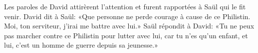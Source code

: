Les paroles de David attirèrent l’attention et furent rapportées à Saül qui le fit venir.
David dit à Saül: «Que personne ne perde courage à cause de ce Philistin.
	Moi, ton serviteur, j’irai me battre avec lui.»
Saül répondit à David: «Tu ne peux pas marcher contre ce Philistin pour lutter avec lui,
	car tu n’es qu’un enfant, et lui, c’est un homme de guerre depuis sa jeunesse.»
